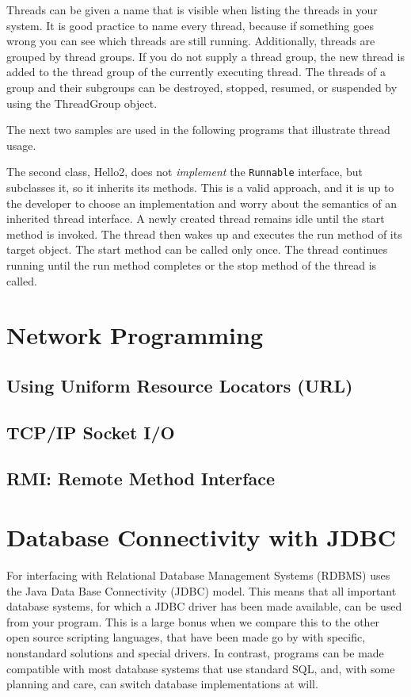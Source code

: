 {Threads can be given a name that is visible when listing the threads in your system. It is good practice to name every thread, because if something goes wrong you can see which threads are still running.
Additionally, threads are grouped by thread groups. If you do not
supply a thread group, the new thread is added to the thread group of
the currently executing thread. The threads of a group and their
subgroups can be destroyed, stopped, resumed, or suspended by using
the ThreadGroup object. 

The next two samples are used in the following programs that
illustrate thread usage.
 
 
The second class, Hello2, does not \emph{implement} the
\texttt{Runnable} interface, but subclasses it, so it inherits its
methods. This is a valid approach, and it is up to the developer to
choose an implementation and worry about the semantics of an inherited
thread interface.
A newly created thread remains idle until the start method is invoked. The thread then wakes up and executes the run method of its target object. The start method can be called only once. The thread continues running until the run method completes or the stop method of the thread is called.



\chapter{Network Programming}
\section{Using Uniform Resource Locators (URL)}
\section{TCP/IP Socket I/O}
\section{RMI: Remote Method Interface}

\chapter{Database Connectivity with JDBC}
For interfacing with Relational Database Management Systems (RDBMS)
\nr{} uses the Java Data Base Connectivity (JDBC) model. This means
that all important database systems, for which a JDBC driver has
been made available, can be used from your \nr{} program. This is a
large bonus when we compare this to the other open source scripting
languages, that have been made go by with specific, nonstandard
solutions and special drivers. In contrast, \nr{} programs can be
made compatible with most database systems that use standard SQL, and,
with some planning and care, can switch database implementations at
will.
 

}

